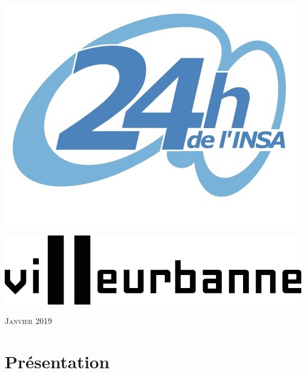 \documentclass[hidelinks, paper=a4, fontsize=13pt]{report}
\begin{document}
   \begin{minipage}[c]{.46\linewidth}
\includegraphics[scale=1]{Annexes/Images/logo24h.jpg}\\
   \end{minipage} \hfill
   \begin{minipage}[c]{.46\linewidth}
\includegraphics[scale=1]{Annexes/Images/villeurnoir}\\
   \end{minipage}
\begin{flushright}
\vspace{15mm}


{\large\textsc{Janvier 2019}}

\vspace{15mm}


\end{flushright}

\newpage


\chapter{Présentation}
\end{document}
